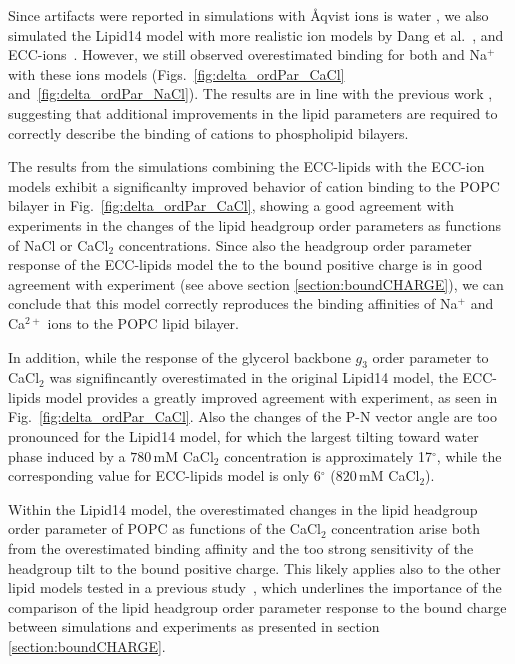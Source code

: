 \documentclass[aip,jcp,twocolumn]{revtex4}
\begin{document}
Since artifacts were reported in simulations with \AA{}qvist ions is water \cite{auffinger07},
we also simulated the Lipid14 model with more realistic ion models by Dang et al.~\cite{smith94,chang1999,dang2006}, and
ECC-ions~\cite{jungwirth17-new-paper-to-be-published, Pluharova2014}. 
However, we still observed overestimated binding for both  and Na$^+$ with these ions models 
(Figs.~\ref{fig:delta_ordPar_CaCl} and~\ref{fig:delta_ordPar_NaCl}). 
The results are in line with the previous work \cite{catte16},
suggesting that additional improvements in the lipid parameters are
required to correctly describe the binding of cations to phospholipid bilayers.

The results from the simulations combining the ECC-lipids with the ECC-ion models \cite{jungwirth17-new-paper-to-be-published, kohagen16, Pluharova2014}
exhibit a significanlty improved behavior of cation binding to the POPC bilayer in Fig.~\ref{fig:delta_ordPar_CaCl},
showing a good agreement with experiments in the changes of 
the lipid headgroup order parameters as functions of NaCl or CaCl$_2$ concentrations.
Since also the headgroup order parameter
response of the ECC-lipids model the to the bound positive charge 
is in good agreement with experiment (see above section \ref{section:boundCHARGE}),
we can conclude that this model correctly reproduces the binding affinities of
Na$^{+}$ and Ca$^{2+}$ ions to the POPC lipid bilayer.

In addition, while the response of the glycerol backbone $g_3$ order parameter to CaCl$_2$ was
signifincantly overestimated in the original Lipid14 model, the ECC-lipids model
provides a greatly improved agreement with experiment, as seen in Fig.~\ref{fig:delta_ordPar_CaCl}.
Also the changes of the P-N vector angle are too pronounced
for the Lipid14 model, for which the largest tilting toward water phase 
induced by a $780\,\mathrm{mM}$ CaCl$_2$ concentration
is approximately 17$^{\circ}$, while the corresponding
value for ECC-lipids model is only 6$^{\circ}$ ($820\,\mathrm{mM}$ CaCl$_2$).

Within the Lipid14 model, 
the overestimated changes in the lipid headgroup order parameter of POPC  as functions of the CaCl$_2$ concentration arise both from the overestimated
binding affinity and the too strong sensitivity of the headgroup tilt to the bound positive charge.
This likely applies also to the other lipid models tested in a previous study~\cite{catte16},
which underlines the importance of the comparison of the lipid headgroup order parameter response
to the bound charge between simulations and experiments as presented in section \ref{section:boundCHARGE}.
\end{document}
